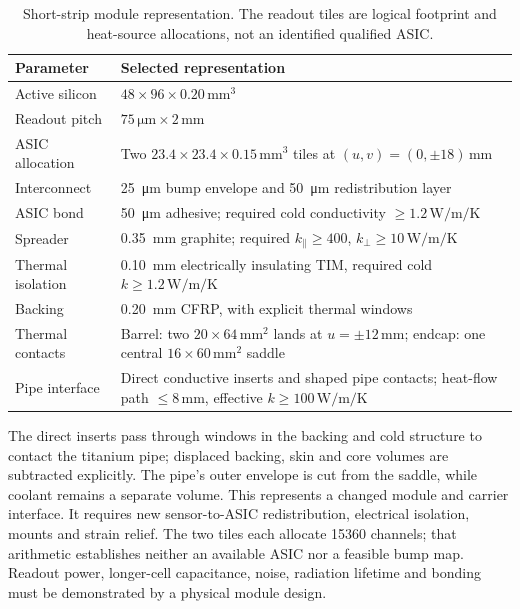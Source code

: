 \begin{table}[!htbp]
\centering\small
\caption{Short-strip module representation. The readout tiles are logical
footprint and heat-source allocations, not an identified qualified ASIC.}
\label{tab:short-module}
\begin{tabular}{@{}lp{87mm}@{}}\toprule
Parameter & Selected representation\\\midrule
Active silicon & $48\times96\times0.20\,\unit{\milli\metre^3}$\\
Readout pitch & $75\,\unit{\micro\metre}\times2\,\unit{\milli\metre}$\\
ASIC allocation & Two $23.4\times23.4\times0.15\,\unit{\milli\metre^3}$ tiles at $(u,v)=(0,\pm18)\,\unit{\milli\metre}$\\
Interconnect & \qty{25}{\micro\metre} bump envelope and \qty{50}{\micro\metre} redistribution layer\\
ASIC bond & \qty{50}{\micro\metre} adhesive; required cold conductivity $\geq1.2\,\unit{\watt\per\metre\per\kelvin}$\\
Spreader & \qty{0.35}{\milli\metre} graphite; required $k_\parallel\geq400$, $k_\perp\geq10\,\unit{\watt\per\metre\per\kelvin}$\\
Thermal isolation & \qty{0.10}{\milli\metre} electrically insulating TIM, required cold $k\geq1.2\,\unit{\watt\per\metre\per\kelvin}$\\
Backing & \qty{0.20}{\milli\metre} CFRP, with explicit thermal windows\\
Thermal contacts & Barrel: two $20\times64\,\unit{\milli\metre^2}$ lands at $u=\pm12\,\unit{\milli\metre}$; endcap: one central $16\times60\,\unit{\milli\metre^2}$ saddle\\
Pipe interface & Direct conductive inserts and shaped pipe contacts; heat-flow path $\leq8\,\unit{\milli\metre}$, effective $k\geq100\,\unit{\watt\per\metre\per\kelvin}$\\\bottomrule
\end{tabular}
\end{table}

The direct inserts pass through windows in the backing and cold structure to
contact the titanium pipe; displaced backing, skin and core volumes are
subtracted explicitly. The pipe's outer envelope is cut from the saddle, while
coolant remains a separate volume. This represents a changed module and carrier
interface. It requires new sensor-to-ASIC redistribution, electrical isolation,
mounts and strain relief. The two tiles each allocate \num{15360} channels;
that arithmetic establishes neither an available ASIC nor a feasible bump map.
Readout power, longer-cell capacitance, noise, radiation lifetime and bonding
must be demonstrated by a physical module design.

